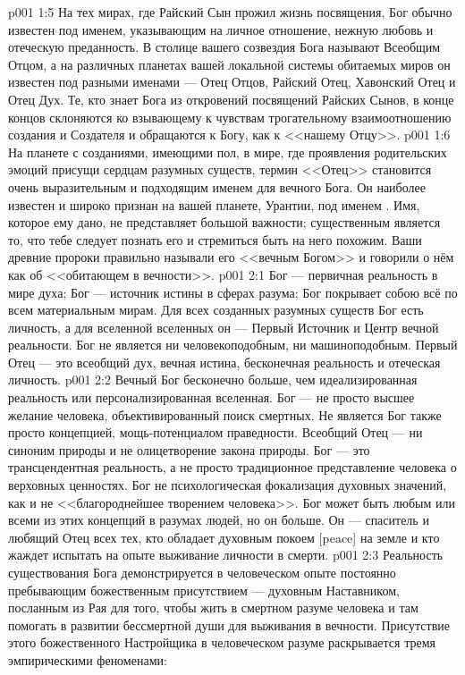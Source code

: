\vs p001 1:5 На тех мирах, где Райский Сын прожил жизнь посвящения, Бог обычно известен под именем, указывающим на личное отношение, нежную любовь и отеческую преданность. В столице вашего созвездия Бога называют Всеобщим Отцом, а на различных планетах вашей локальной системы обитаемых миров он известен под разными именами --- Отец Отцов, Райский Отец, Хавонский Отец и Отец Дух. Те, кто знает Бога из откровений посвящений Райских Сынов, в конце концов склоняются ко взывающему к чувствам трогательному взаимоотношению создания и Создателя и обращаются к Богу, как к <<нашему Отцу>>.
\vs p001 1:6 На планете с созданиями, имеющими пол, в мире, где проявления родительских эмоций присущи сердцам разумных существ, термин <<Отец>> становится очень выразительным и подходящим именем для вечного Бога. Он наиболее известен и широко признан на вашей планете, Урантии, под именем . Имя, которое ему дано, не представляет большой важности; существенным является то, что тебе следует познать его и стремиться быть на него похожим. Ваши древние пророки правильно называли его <<вечным Богом>> и говорили о нём как об <<обитающем в вечности>>.
\vs p001 2:1 Бог --- первичная реальность в мире духа; Бог --- источник истины в сферах разума; Бог покрывает собою всё по всем материальным мирам. Для всех созданных разумных существ Бог есть личность, а для вселенной вселенных он --- Первый Источник и Центр вечной реальности. Бог не является ни человекоподобным, ни машиноподобным. Первый Отец --- это всеобщий дух, вечная истина, бесконечная реальность и отеческая личность.
\vs p001 2:2 \pc Вечный Бог бесконечно больше, чем идеализированная реальность или персонализированная вселенная. Бог --- не просто высшее желание человека, объективированный поиск смертных. Не является Бог также просто концепцией, мощь\hyp{}потенциалом праведности. Всеобщий Отец --- ни синоним природы и не олицетворение закона природы. Бог --- это трансцендентная реальность, а не просто традиционное представление человека о верховных ценностях. Бог не психологическая фокализация духовных значений, как и не <<благороднейшее творением человека>>. Бог может быть любым или всеми из этих концепций в разумах людей, но он больше. Он --- спаситель и любящий Отец всех тех, кто обладает духовным покоем [peace] на земле и кто жаждет испытать на опыте выживание личности в смерти.
\vs p001 2:3 \pc Реальность существования Бога демонстрируется в человеческом опыте постоянно пребывающим божественным присутствием --- духовным Наставником, посланным из Рая для того, чтобы жить в смертном разуме человека и там помогать в развитии бессмертной души для выживания в вечности. Присутствие этого божественного Настройщика в человеческом разуме раскрывается тремя эмпирическими феноменами:
